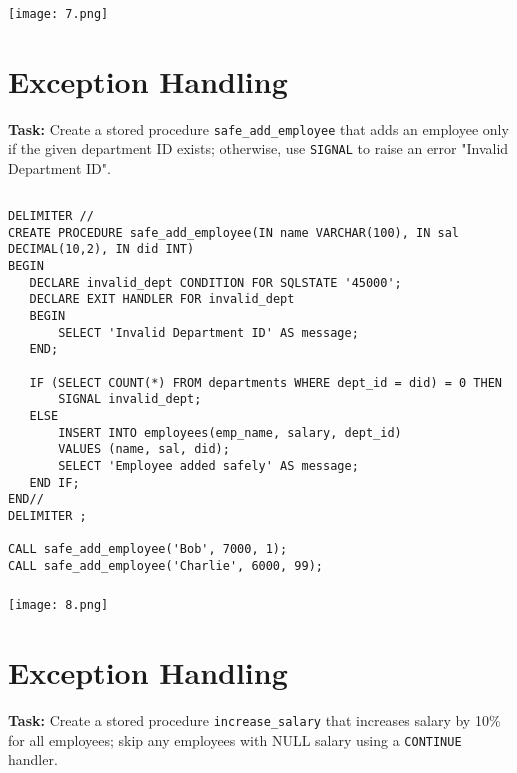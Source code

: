 \documentclass[12pt, a4paper]{article}
\begin{document}
\subsubsection{}
\begin{center}
    \texttt{[image: 7.png]}
\end{center}

\section{Exception Handling}
\textbf{Task:} Create a stored procedure \texttt{safe\_add\_employee} that adds an employee 
only if the given department ID exists; otherwise, use \texttt{SIGNAL} to raise 
an error "Invalid Department ID".

\subsection{}
\begin{lstlisting}
DELIMITER //
CREATE PROCEDURE safe_add_employee(IN name VARCHAR(100), IN sal DECIMAL(10,2), IN did INT)
BEGIN
   DECLARE invalid_dept CONDITION FOR SQLSTATE '45000';
   DECLARE EXIT HANDLER FOR invalid_dept
   BEGIN
       SELECT 'Invalid Department ID' AS message;
   END;

   IF (SELECT COUNT(*) FROM departments WHERE dept_id = did) = 0 THEN
       SIGNAL invalid_dept;
   ELSE
       INSERT INTO employees(emp_name, salary, dept_id)
       VALUES (name, sal, did);
       SELECT 'Employee added safely' AS message;
   END IF;
END//
DELIMITER ;

CALL safe_add_employee('Bob', 7000, 1);
CALL safe_add_employee('Charlie', 6000, 99);

\end{lstlisting}

\subsubsection{}
\begin{center}
    \texttt{[image: 8.png]}
\end{center}

\section{Exception Handling}
\textbf{Task:} Create a stored procedure \texttt{increase\_salary} that increases salary 
by 10\% for all employees; skip any employees with NULL salary using a \texttt{CONTINUE} handler.
\end{document}
